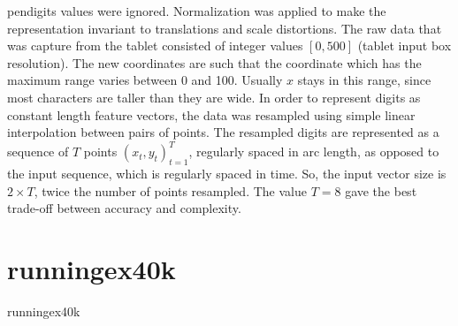 \begin{dataSetDescription}{pendigits}
{        values were ignored. Normalization was applied to make the
        representation invariant to translations and scale distortions. The raw
        data that was capture from the tablet consisted of integer values
        $\left[0,500\right]$ (tablet input box resolution). The new coordinates
        are such that the coordinate which has the maximum range varies between
        0 and 100. Usually $x$ stays in this range, since most characters are
        taller than they are wide.
        \newline
        In order to represent digits as constant length feature vectors, the
        data was resampled using simple linear interpolation between pairs of
        points. The resampled digits are represented as a sequence of $T$ points
        $\left(x_{t},y_{t}\right)_{t=1}^{T}$, regularly spaced in arc length,
        as opposed to the input sequence, which is regularly spaced in time.
        \newline
        So, the input vector size is $2 \times T$, twice the number of points
        resampled. The value $T=8$ gave the best trade-off between accuracy and
        complexity.
    }
\end{dataSetDescription}

\section{runningex40k}
\label{sec:dataSets:runningex40k}
\begin{dataSetDescription}{runningex40k}
\end{dataSetDescription}

